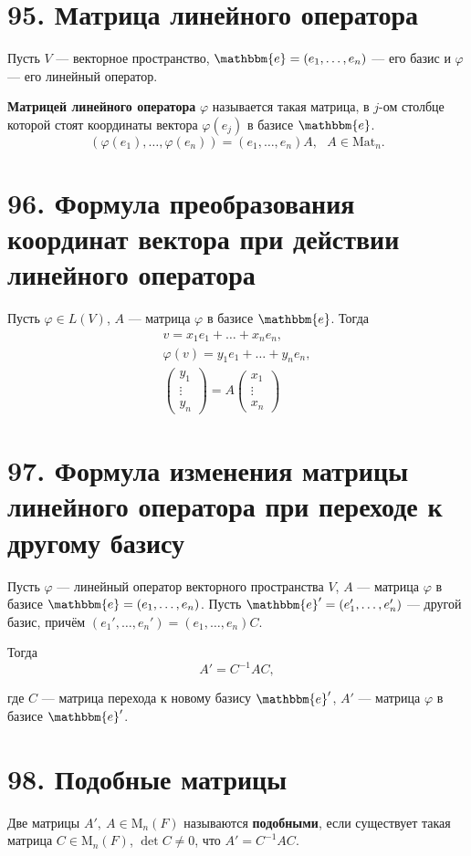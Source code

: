 \documentclass[a4paper, 12pt]{article}
\newcommand{\me}{\mathbbm{e}}
\begin{document}
\section*{95. Матрица линейного оператора}
Пусть $V$ --- векторное пространство, $\me = (e_1, \ldots, e_n)$ --- его базис и $\varphi$ --- его линейный оператор.

\textbf{Матрицей линейного оператора} $\varphi$ называется такая матрица, в $j$-ом столбце которой стоят координаты вектора $\varphi(e_j)$ в базисе $\me$.
\[
(\varphi(e_1), \ldots, \varphi(e_n)) = (e_1, \ldots, e_n) A,\ \ \ A \in \text{Mat}_n.
\]

\section*{96. Формула преобразования координат вектора при действии линейного оператора}
Пусть $\varphi \in L(V)$, $A$ --- матрица $\varphi$ в базисе $\me$. Тогда
\begin{align*}
v = x_1e_1 + \ldots + x_ne_n, \\
\varphi(v) = y_1e_1 + \ldots + y_ne_n, \\
\begin{pmatrix}
y_1 \\
\vdots \\
y_n
\end{pmatrix} = A
\begin{pmatrix}
x_1 \\
\vdots \\
x_n
\end{pmatrix}
\end{align*}

\section*{97. Формула изменения матрицы линейного оператора при переходе к другому базису}
Пусть $\varphi$ --- линейный оператор векторного пространства $V$, $A$ --- матрица $\varphi$ в базисе $\me = (e_1, \ldots, e_n)$. Пусть $\me' = (e_1', \ldots, e_n')$ --- другой базис, причём $(e_1', \ldots, e_n') = (e_1, \ldots, e_n)C$. 

Тогда
\[
A' = C^{-1}AC,
\]

где $C$ --- матрица перехода к новому базису $\me'$, $A'$ --- матрица $\varphi$ в базисе $\me'$.

\section*{98. Подобные матрицы}
Две матрицы $A',\ A \in \text{M}_n(F)$ называются \textbf{подобными}, если существует такая матрица $C \in \text{M}_n(F)$,  $\det C \neq 0$, что $A' = C^{-1}AC$.
\end{document}
